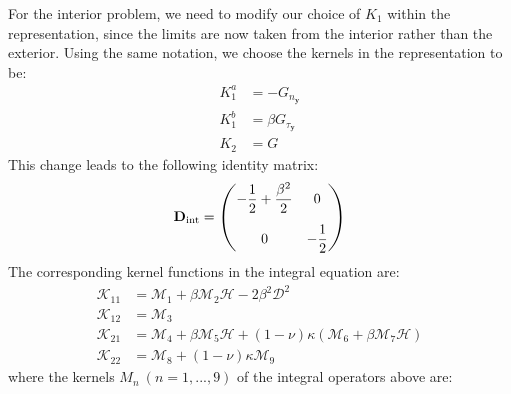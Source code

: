 \documentclass[preprint,12pt,3p]{elsarticle}
\begin{document}
For the interior problem, we need to modify our choice of $K_{1}$  within the representation, since the limits are now taken from the interior rather than the exterior. Using the same notation, we choose the kernels in the representation to be: 
\begin{align}
    K_1^a &= -G_{n_\mathbf{y}} \\
    K_1^b &= \beta G_{\tau_\mathbf{y}} \\
    K_2 &= G  
\end{align}
This change leads to the following identity matrix:
\begin{align}
    \mathbf{D}_{\rm int} = \begin{pmatrix}
        \vspace{0.3cm} \displaystyle-\frac{1}{2} + \frac{\beta^2}{2} & 0 \\ 0  & \displaystyle-\frac{1}{2} 
    \end{pmatrix} \label{freeidinterior}
\end{align}
The corresponding kernel functions in the integral equation are:
\begin{align}
    \mathcal{K}_{11}  &=  \mathcal{M}_{1} + \beta \mathcal{M}_{2} \mathcal{H}  - 2  \beta^2 \mathcal{D}^2  \\ 
    \mathcal{K}_{12} &=  \mathcal{M}_{3}\\
    \mathcal{K}_{21} &=  \mathcal{M}_{4} 
    + \beta  \mathcal{M}_{5} \mathcal{H} + (1-\nu) \kappa \left(  \mathcal{M}_{6} +  \beta  \mathcal{M}_{7} \mathcal{H}  \right)  \\
    \mathcal{K}_{22} &=  \mathcal{M}_{8}  + (1-\nu) \kappa  \mathcal{M}_{9} \label{lastfreekerninterior}
\end{align}
where the kernels $ M_{n} \ (n = 1,...,9)$ of the integral operators above are: 
\end{document}
